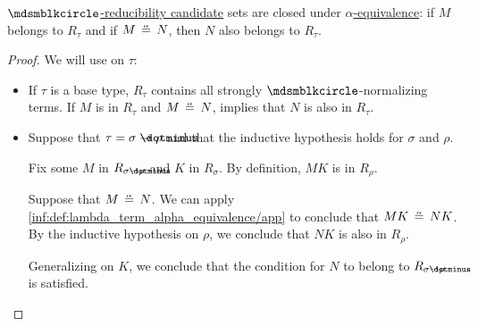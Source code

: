 \begin{lemma}\label{thm:alpha_equivalent_reducibility_candidates}
  \hyperref[def:strong_normalization_reducibility_candidate]{\( \Anon \)-reducibility candidate} sets are closed under \hyperref[def:lambda_term_alpha_equivalence]{\( \alpha \)-equivalence}: if \( M \) belongs to \( R_\tau \) and if \( M \aequiv N \), then \( N \) also belongs to \( R_\tau \).
\end{lemma}
\begin{proof}
  We will use  on \( \tau \):
  \begin{itemize}
    \item If \( \tau \) is a base type, \( R_\tau \) contains all strongly \( \Anon \)-normalizing terms. If \( M \) is in \( R_\tau \) and \( M \aequiv N \),  implies that \( N \) is also in \( R_\tau \).

    \item Suppose that \( \tau = \sigma \synimplies \rho \) and that the inductive hypothesis holds for \( \sigma \) and \( \rho \).

    Fix some \( M \) in \( R_{\sigma \synimplies \rho} \) and \( K \) in \( R_\sigma \). By definition, \( MK \) is in \( R_\rho \).

    Suppose that \( M \aequiv N \). We can apply \ref{inf:def:lambda_term_alpha_equivalence/app} to conclude that \( MK \aequiv NK \). By the inductive hypothesis on \( \rho \), we conclude that \( NK \) is also in \( R_\rho \).

    Generalizing on \( K \), we conclude that the condition for \( N \) to belong to \( R_{\sigma \synimplies \rho} \) is satisfied.
  \end{itemize}
\end{proof}

